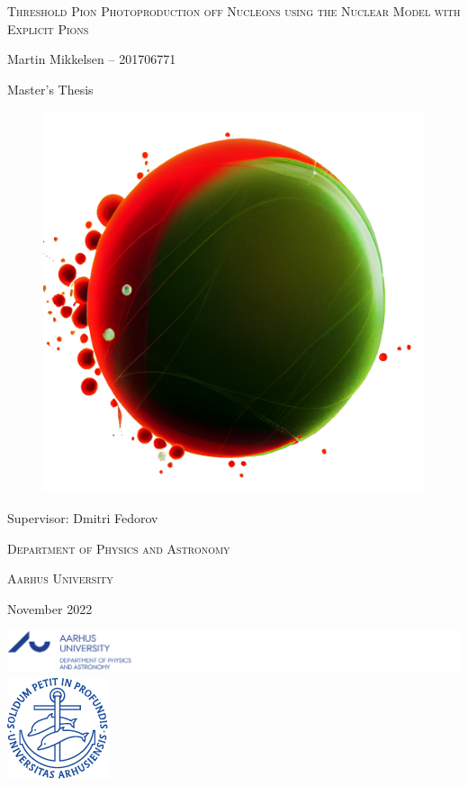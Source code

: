\documentclass[a4paper, 12pt,oneside]{memoir}
\newcommand{\projecttitle}{Threshold Pion Photoproduction off Nucleons using the Nuclear Model with Explicit Pions}
\newcommand{\projectauthor}{Martin Mikkelsen }
\newcommand{\projectauthorID}{201706771}
\newcommand{\projectsupervisor}{Dmitri Fedorov}
\newcommand{\projectdate}{November 2022}
\newcommand{\projectdepartment}{Department of Physics and Astronomy}
\newcommand{\projectuniversity}{Aarhus University}
\begin{document}
\pagestyle{empty}
\begin{center}
	
	\fontsize{26pt}{29pt}\selectfont
	
	\textsc{\projecttitle} \par
	
	\vspace{0.75cm}
	
	\fontsize{20pt}{24pt}\selectfont
	
	\projectauthor -- 
	\projectauthorID \par
	\vspace{0.5cm}
	
	\fontsize{16pt}{16pt}\selectfont
	Master's Thesis
	
	\vspace{0.2cm}
	\begin{center}
	\begin{figure}[H]
		\centering
		\hspace*{0cm}
		\includegraphics[width=0.55\linewidth]{Pion-NucleonSystem.png}
		\label{fig:pion-nucleonsystem}
	\end{figure}
\end{center}
	\vspace{0.2cm}
	
	\fontsize{20pt}{24pt}\selectfont
	 Supervisor: \projectsupervisor \par
	
	\vspace{1cm}
	
	\fontsize{18pt}{22pt}\selectfont
	
	\textsc{\projectdepartment} \par
	\textsc{\projectuniversity} \par
	
	\vspace{1cm}
	
	\projectdate
\end{center}
\vfill
\noindent
\includegraphics{Logo_Department_en}
\hfill
\includegraphics{segla1b}
\end{document}
